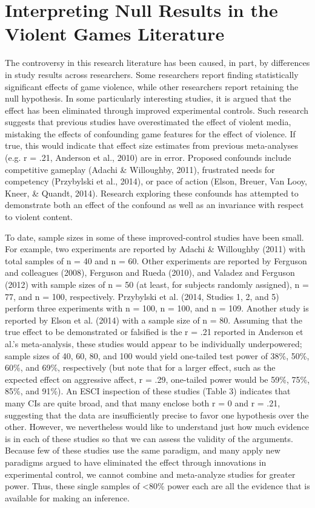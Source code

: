 \documentclass[fignum,nobf,man]{apa}
\begin{document}
\section{Interpreting Null Results in the Violent Games Literature}
The controversy in this research literature has been caused, in part, by differences in study results across researchers. Some researchers report finding statistically significant effects of game violence, while other researchers report retaining the null hypothesis. In some particularly interesting studies, it is argued that the effect has been eliminated through improved experimental controls. Such research suggests that previous studies have overestimated the effect of violent media, mistaking the effects of confounding game features for the effect of violence. If true, this would indicate that effect size estimates from previous meta-analyses (e.g. r = .21, Anderson et al., 2010) are in error. Proposed confounds include competitive gameplay (Adachi \& Willoughby, 2011), frustrated needs for competency (Przybylski et al., 2014), or pace of action (Elson, Breuer, Van Looy, Kneer, \& Quandt, 2014). Research exploring these confounds has attempted to demonstrate both an effect of the confound as well as an invariance with respect to violent content. 

To date, sample sizes in some of these improved-control studies have been small. For example, two experiments are reported by Adachi \& Willoughby (2011) with total samples of n = 40 and n = 60. Other experiments are reported by Ferguson and colleagues (2008), Ferguson and Rueda (2010), and Valadez and Ferguson (2012) with sample sizes of n = 50 (at least, for subjects randomly assigned), n = 77, and n = 100, respectively. Przybylski et al. (2014, Studies 1, 2, and 5) perform three experiments with n = 100, n = 100, and n = 109. Another study is reported by Elson et al. (2014) with a sample size of n = 80. Assuming that the true effect to be demonstrated or falsified is the r = .21 reported in Anderson et al.’s meta-analysis, these studies would appear to be individually underpowered; sample sizes of 40, 60, 80, and 100 would yield one-tailed test power of 38\%, 50\%, 60\%, and 69\%, respectively (but note that for a larger effect, such as the expected effect on aggressive affect, r = .29, one-tailed power would be 59\%, 75\%, 85\%, and 91\%). An ESCI inspection of these studies (Table 3) indicates that many CIs are quite broad, and that many enclose both r = 0 and r = .21, suggesting that the data are insufficiently precise to favor one hypothesis over the other. However, we nevertheless would like to understand just how much evidence is in each of these studies so that we can assess the validity of the arguments. Because few of these studies use the same paradigm, and many apply new paradigms argued to have eliminated the effect through innovations in experimental control, we cannot combine and meta-analyze studies for greater power. Thus, these single samples of <80\% power each are all the evidence that is available for making an inference.
\end{document}
